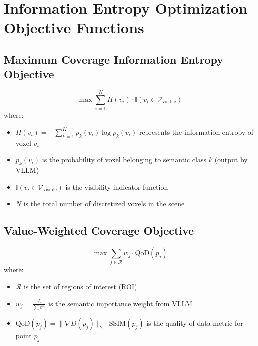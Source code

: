 


	
\section{Information Entropy Optimization Objective Functions}

\subsection{Maximum Coverage Information Entropy Objective}
\begin{equation}
	\max \sum_{i=1}^N H(v_i) \cdot \mathbb{I}(v_i \in \mathcal{V}_{\text{visible}})
\end{equation}
where:
\begin{itemize}
	\item $H(v_i) = -\sum_{k=1}^K p_k(v_i)\log p_k(v_i)$ represents the information entropy of voxel $v_i$
	\item $p_k(v_i)$ is the probability of voxel belonging to semantic class $k$ (output by VLLM)
	\item $\mathbb{I}(v_i \in \mathcal{V}_{\text{visible}})$ is the visibility indicator function
	\item $N$ is the total number of discretized voxels in the scene
\end{itemize}

\subsection{Value-Weighted Coverage Objective}
\begin{equation}
	\max \sum_{j \in \mathcal{R}} w_j \cdot \text{QoD}(p_j)
\end{equation}
where:
\begin{itemize}
	\item $\mathcal{R}$ is the set of regions of interest (ROI)
	\item $w_j = \frac{e^{s_j}}{\sum e^{s_k}}$ is the semantic importance weight from VLLM
	\item $\text{QoD}(p_j) = \|\nabla D(p_j)\|_2 \cdot \text{SSIM}(p_j)$ is the quality-of-data metric for point $p_j$
\end{itemize}

